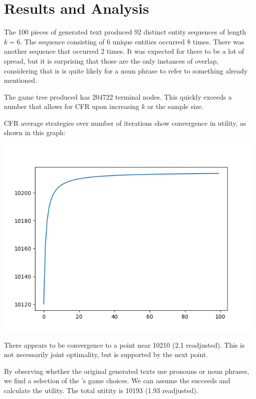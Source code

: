 \documentclass[11pt]{article}
\begin{document}
    \section{Results and Analysis}\label{sec:results-and-analysis}

    The 100 pieces of generated text produced 92 distinct entity sequences of length $k = 6$.
    The sequence consisting of 6 unique entities occurred 8 times.
    There was another sequence that occurred 2 times.
    It was expected for there to be a lot of spread,
    but it is surprising that those are the only instances of overlap,
    considering that is is quite likely for a noun phrase to refer to something already mentioned.

    The game tree produced has 204722 terminal nodes.
    This quickly exceeds a number that allows for CFR upon
    increasing $k$ or the sample size.

    CFR average strategies over number of iterations
    show convergence in utility, as shown in this graph:
    \begin{center}
        \includegraphics[scale=0.8]{plot/utility}
    \end{center}
    There appears to be convergence to a point near 10210 (2.1 readjusted).
    This is not necessarily joint optimality,
    but is supported by the next point.

    By observing whether the original generated texts use pronouns or noun phrases,
    we find a selection of the \Generator{}'s game choices.
    We can assume the \Resolver{} succeeds and calculate the utility.
    The total utitity is 10193 (1.93 readjusted).
\end{document}
